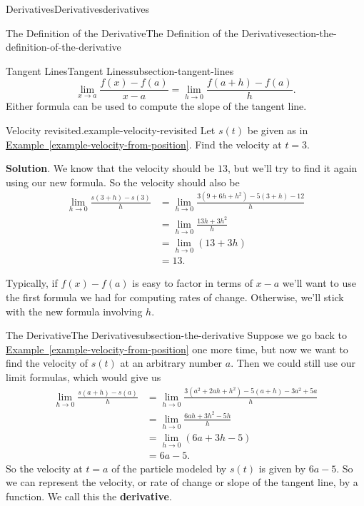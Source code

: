 \documentclass[oneside,10pt,]{book}
\newcommand{\terminology}[1]{\textbf{#1}}
\numberwithin{equation}{section}
\begin{document}
\begin{chapterptx}{Derivatives}{}{Derivatives}{}{}{derivatives}
\begin{sectionptx}{The Definition of the Derivative}{}{The Definition of the Derivative}{}{}{section-the-definition-of-the-derivative}
\begin{subsectionptx}{Tangent Lines}{}{Tangent Lines}{}{}{subsection-tangent-lines}
\begin{equation*}
\lim_{x\to a}\frac{f(x) - f(a)}{x-a} = \lim_{h\to0}\frac{f(a+h)-f(a)}{h}.
\end{equation*}
Either formula can be used to compute the slope of the tangent line.%
\begin{example}{Velocity revisited.}{example-velocity-revisited}%
\hypertarget{p-88}{}%
Let \(s(t)\) be given as in \hyperref[example-velocity-from-position]{Example~\ref{example-velocity-from-position}}. Find the velocity at \(t=3\).%
\par\smallskip%
\noindent\textbf{Solution}.\hypertarget{solution-19}{}\quad%
\hypertarget{p-89}{}%
We know that the velocity should be \(13\), but we'll try to find it again using our new formula. So the velocity should also be%
%
\begin{align*}
\lim_{h\to0}\frac{s(3+h)-s(3)}{h} & = \lim_{h\to0}\frac{3(9+6h+h^{2})-5(3+h)-12}{h} \\
& = \lim_{h\to0}\frac{13h+3h^{2}}{h} \\
& = \lim_{h\to0}(13+3h) \\
& = 13. 
\end{align*}
\end{example}
\hypertarget{p-90}{}%
Typically, if \(f(x)-f(a)\) is easy to factor in terms of \(x-a\) we'll want to use the first formula we had for computing rates of change. Otherwise, we'll stick with the new formula involving \(h\).%
\end{subsectionptx}
%
%
\typeout{************************************************}
\typeout{************************************************}
%
\begin{subsectionptx}{The Derivative}{}{The Derivative}{}{}{subsection-the-derivative}
\hypertarget{p-91}{}%
Suppose we go back to \hyperref[example-velocity-from-position]{Example~\ref{example-velocity-from-position}} one more time, but now we want to find the velocity of \(s(t)\) at an arbitrary number \(a\). Then we could still use our limit formulas, which would give us%
%
\begin{align*}
\lim_{h\to0}\frac{s(a+h)-s(a)}{h} & = \lim_{h\to0}\frac{3(a^{2}+2ah+h^{2})-5(a+h) - 3a^{2} + 5a}{h} \\
& = \lim_{h\to0}\frac{6ah+3h^{2} - 5h}{h} \\
& = \lim_{h\to0}(6a+3h-5) \\
& = 6a-5. 
\end{align*}
\hypertarget{p-92}{}%
So the velocity at \(t=a\) of the particle modeled by \(s(t)\) is given by \(6a-5\). So we can represent the velocity, or rate of change or slope of the tangent line, by a function. We call this the \terminology{derivative}.%

\end{subsectionptx}
\end{sectionptx}
\end{chapterptx}
\end{document}
